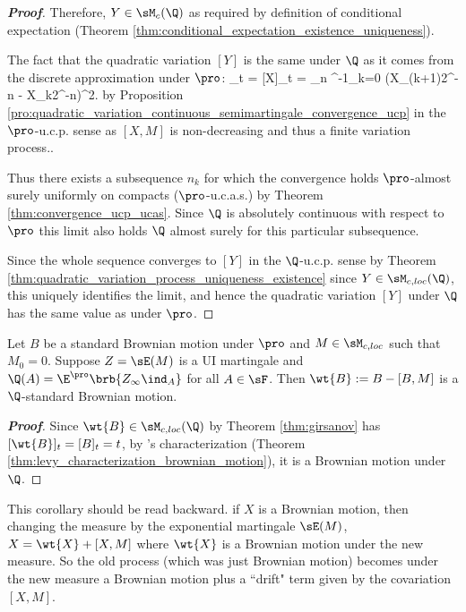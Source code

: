 \begin{proof}[\bf Proof]
Therefore, $Y \in \sM_c(\Q)$ as required by definition of conditional expectation (Theorem \ref{thm:conditional_expectation_existence_uniqueness}).

The fact that the quadratic variation $[Y]$ is the same under $\Q$ as it comes from the discrete approximation under $\pro$:
\be
[Y]_t = [X]_t = \lim_{n\to\infty} \sum^{-1}_{k=0} (X_{(k+1)2^{-n}} - X_{k2^{-n}})^2.%
\ee%
by Proposition \ref{pro:quadratic_variation_continuous_semimartingale_convergence_ucp} in the $\pro$-u.c.p. sense as $[X,M]$ is non-decreasing and thus a finite variation process..%

Thus there exists a subsequence $n_k$ for which the convergence holds $\pro$-almost surely uniformly on compacts ($\pro$-u.c.a.s.) by Theorem \ref{thm:convergence_ucp_ucas}.
Since $\Q$ is absolutely continuous with respect to $\pro$ this limit also holds $\Q$ almost surely for this particular subsequence.

Since the whole sequence converges to $[Y]$ in the $\Q$-u.c.p. sense by Theorem \ref{thm:quadratic_variation_process_uniqueness_existence} since $Y \in \sM_{c,loc}(\Q)$, this uniquely identifies the limit,
and hence the quadratic variation $[Y]$ under $\Q$ has the same value as under $\pro$.
\end{proof}


\begin{corollary}\label{cor:brownian_motion_change_measure}
Let $B$ be a standard Brownian motion under $\pro$ and $M \in \sM_{c,loc}$ such that $M_0 = 0$. Suppose $Z = \sE(M)$ is a UI martingale and $\Q(A) = \E^{\pro}\brb{Z_\infty \ind_A}$ for all $A \in \sF$.
Then $\wt{B} := B - [B,M]$ is a $\Q$-standard Brownian motion.
\end{corollary}

\begin{proof}[\bf Proof]
Since $\wt{B} \in \sM_{c,loc}(\Q)$ by Theorem \ref{thm:girsanov} has $[\wt{B}]_t = [B]_t = t$, by \levy's characterization (Theorem \ref{thm:levy_characterization_brownian_motion}), it is a Brownian motion under $\Q$.
\end{proof}


\begin{remark}
This corollary should be read backward. if $X$ is a Brownian motion, then changing the measure by the exponential martingale $\sE(M)$, $X = \wt{X} + [X,M]$ where $\wt{X}$ is a Brownian motion under
the new measure. So the old process (which was just Brownian motion) becomes under the new measure a Brownian motion plus a ``drift" term given by the covariation $[X,M]$.
\end{remark}



